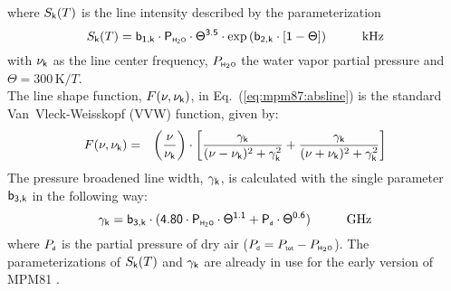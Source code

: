 where $S_{\sf k}(T)$ is the line intensity described by the parameterization
\begin{equation}
  \label{eq:mpm87:strength}
  \inten = \bek \cdot \phzo \cdot \Theta^{3.5} 
           \cdot \exp{(\bzk \cdot [1-\Theta])}\hspace*{10mm}\mbox{kHz}
\end{equation}
with $\nu_{\sf k}$ as the line center frequency, $P_{\mbox{\tiny \sf H}_{2}\mbox{\tiny \sf O}}$ the water
vapor partial pressure and $\Theta = 300\,\mbox{K}/T$.\\
The line shape function, $F(\nu,\nu_{\sf k})$, in Eq.~(\ref{eq:mpm87:absline}) 
is the standard Van~Vleck-Weisskopf (VVW) function, given by:
\begin{eqnarray}
  \label{eq:mpm87:VVW}
  F(\nu,\nu_{\sf k}) & = & \left(\frac{\nu}{\nu_{\sf k}}\right) \cdot 
               \left[\frac{\gamma_{\sf k}}{(\nu - \nu_{\sf k})^2 + \gamma_{\sf k}^2} + 
                     \frac{\gamma_{\sf k}}{(\nu + \nu_{\sf k})^2 + \gamma_{\sf k}^2}\right]\\
\end{eqnarray}
The pressure broadened line width, $\gamma_{\sf k}$, is calculated with the 
single parameter $\sf b_{\sf 3,k}$ in the following way:
\begin{equation}
  \label{eq:mpm87:gamma}
  \gamk = \bdk \cdot 
          (4.80 \cdot \phzo \cdot \Theta^{1.1} + \pda \cdot
          \Theta^{0.6})\hspace*{10mm}\mbox{GHz}
\end{equation}
where $P_{\mbox{\tiny \sf d}}$ is the partial pressure of dry air ($P_{\mbox{\tiny \sf d}}=P_{\mbox{\tiny \sf tot}}-P_{\mbox{\tiny \sf H}_{2}\mbox{\tiny \sf O}}$). 
The parameterizations of $S_{\sf k}(T)$ and $\gamma_{\sf k}$ are already in use for the 
early version of MPM81 \cite{liebe:81}.\\
%
